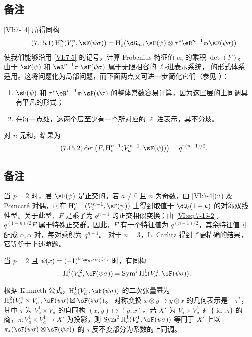 \subsection{备注}\label{VI:7-15}
\ref{VI:7-14} 所得同构
\begin{equation*}\tag{7.15.1}\label{VI:eq:7-15-1}
\h_c^n(V_a^n,\sF(\psi\sigma))
=\h_c^1(\dG_m,\sF(\psi)\otimes\tau^\ast\eR^{n-1}\pi_!\sF(\psi\sigma))
\end{equation*}
使我们能够沿用 \ref{VI:7-5} 的记号，计算 Frobenius 特征值 $\alpha_i$ 的乘积 $\det(F)$。由于 $\sF(\psi)$ 和 $\eR^{n-1}\pi_!\sF(\psi\sigma)$ 属于无限相容的 $\ell$-进表示系统，\cite{de73} 的形式体系适用。这将问题化为局部问题，而下面两点又可进一步简化它们（参见 \cite[9.5]{de73}）：
\begin{enumerate}[\indent a)]
\item $\sF(\psi)$ 和 $\tau^\ast\eR^{n-1}\pi_!\sF(\psi\sigma)$ 的整体常数容易计算，因为这些层的上同调具有平凡的形式；
\item 在每一点处，这两个层至少有一个所对应的 $\ell$-进表示，其不分歧。
\end{enumerate}
对 $n$ 元和，结果为
\begin{equation*}\tag{7.15.2}\label{VI:eq:7-15-2}
\det\left(F,\h_c^{n-1}(V_a^{n-1},\sF(\psi))\right)=q^{n(n-1)/2}.
\end{equation*}

\subsection{备注}\label{VI:7-16}
当 $p=2$ 时，层 $\sF(\psi)$ 是正交的。若 $a\ne0$ 且 $n$ 为奇数，由 \ref{VI:7-4}(ii) 及 Poincaré 对偶，可在 $\h_c^{n-1}(V_a^{n-1},\sF(\psi))$ 上得到取值于 $\bar\dQ_\ell(1-n)$ 的对称双线性型。关于此型，$F$ 是乘子为 $q^{n-1}$ 的正交相似变换；由 \eqref{VI:eq:7-15-2}，$q^{(1-n)/2}F$ 属于特殊正交群。因此，$F$ 有一个特征值为 $q^{(n-1)/2}$，其余特征值可配成 $\alpha,\bar\alpha$ 对，每对乘积为 $q^{n-1}$。
对于 $n=3$，L. Carlitz \cite{ca69-2} 得到了更精确的结果，它等价于下述命题。

\begin{proposition_}\label{VI:7-17}
当 $p=2$ 且 $\psi(x)=(-1)^{\tr_{\dF_q/\dF_2}(x)}$ 时，有同构
\[\h_c^2(V_a^2,\sF(\psi\sigma))
=\operatorname{Sym}^2\h_c^1(V_a^1,\sF(\psi\sigma)).\]
\end{proposition_}
根据 Künneth 公式，$\h_c^1(V_a^1,\sF(\psi\sigma))$ 的二次张量幂为
$\h_c^2(V_a^1\times V_a^1,\sF(\psi\sigma)\boxtimes\sF(\psi\sigma))$。
对称变换 $x\otimes y\mapsto y\otimes x$ 的几何表示是 $-\tau^\ast$，其中 $\tau$ 为 $V_a^1\times V_a^1$ 的自同构 $(x,y)\mapsto(y,x)$。若 $X'$ 为 $V_a^1\times V_a^1$ 对 $\{\operatorname{id},\tau\}$ 的商，$\pi:V_a^1\times V_a^1\to X'$ 为投影，则
$\operatorname{Sym}^2\h_c^1(V_a^1,\sF(\psi\sigma))$
等同于 $X'$ 上以
$\pi_\ast(\sF(\psi\sigma)\boxtimes\sF(\psi\sigma))$
的 $\tau$-反不变部分为系数的上同调。

